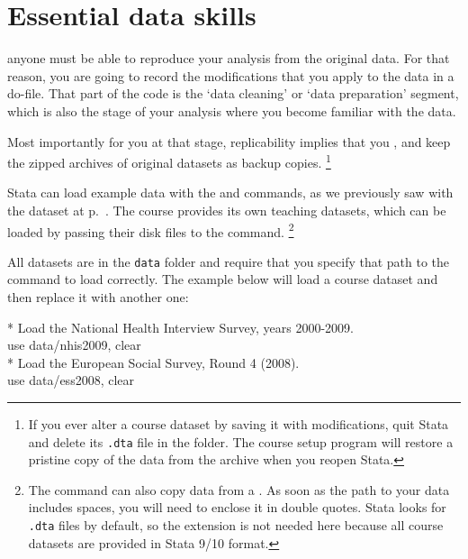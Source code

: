%
%
\section{Essential data skills}

	 anyone must be able to reproduce your analysis from the original data. For that reason, you are going to record the modifications that you apply to the data in a do-file. That part of the code is the `data cleaning' or `data preparation' segment, which is also the stage of your analysis where you become familiar with the data.%
	
	Most importantly for you at that stage, replicability implies that you , and keep the zipped archives of original datasets as backup copies.%
		\footnote{If you ever alter a course dataset by saving it with modifications, quit Stata and delete its \texttt{.dta} file in the \data folder. The course setup program will restore a pristine copy of the data from the \ZIP archive when you reopen Stata.}%

	 Stata can load example data with the  and  commands, as we previously saw with the  dataset at p.~\pageref{lifeexp}. The course provides its own teaching datasets, which can be loaded by passing their disk files to the  command.%
		\footnote{The  command can also copy data from a \URL. As soon as the path to your data includes spaces, you will need to enclose it in double quotes. Stata looks for \texttt{.dta} files by default, so the extension is not needed here because all course datasets are provided in Stata 9/10 format.}%

	All datasets are in the \texttt{data} folder and require that you specify that path to the  command to load correctly. The example below will load a course dataset and then replace it with another one:%

		\begin{docspec}
			* Load the National Health Interview Survey, years 2000-2009.\\
			use data/nhis2009, clear\\[1em]

			* Load the European Social Survey, Round 4 (2008).\\
			use data/ess2008, clear\\
		\end{docspec}

